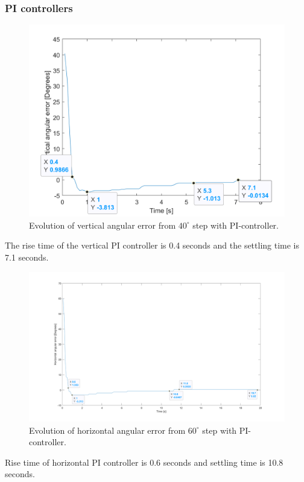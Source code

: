 \subsubsection{PI controllers}
\begin{figure}[H]
\centering
\includegraphics[width=\textwidth]{assets/Vertical_PI_controller.png}
\caption{Evolution of vertical angular error from \(40^{\circ}\) step with PI-controller.}
\label{vert_P}
\end{figure}
The rise time of the vertical PI controller is 0.4 seconds and the settling time is 7.1 seconds.
\begin{figure}[H]
\centering
\includegraphics[width=\textwidth]{assets/Horizontal_PI_controller.png}
\caption{Evolution of horizontal angular error from \(60^{\circ}\) step with PI-controller.}
\label{vert_P}
\end{figure}
Rise time of horizontal PI controller is 0.6 seconds and settling time is 10.8 seconds.

